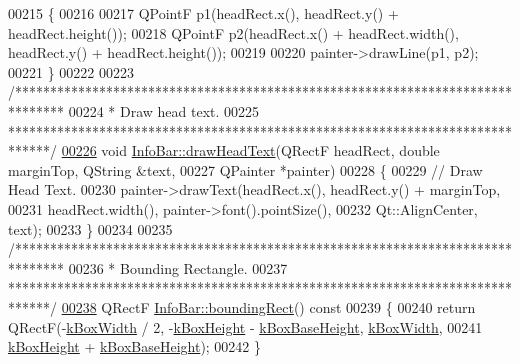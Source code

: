 \begin{DoxyCode}
00215 \{
00216 
00217   QPointF p1(headRect.x(), headRect.y() + headRect.height());
00218   QPointF p2(headRect.x() + headRect.width(), headRect.y() + headRect.height());
00219 
00220   painter->drawLine(p1, p2);
00221 \}
00222 
00223 \textcolor{comment}{/*******************************************************************************}
00224 \textcolor{comment}{ * Draw head text.}
00225 \textcolor{comment}{ ******************************************************************************/}
\hypertarget{infobar_8cpp_source_l00226}{}\hyperlink{class_info_bar_a912f4b2babec3df1aad3d31bc54a6e34}{00226} \textcolor{keywordtype}{void} \hyperlink{class_info_bar_a912f4b2babec3df1aad3d31bc54a6e34}{InfoBar::drawHeadText}(QRectF headRect, \textcolor{keywordtype}{double} marginTop, QString &text,
00227                            QPainter *painter)
00228 \{
00229   \textcolor{comment}{// Draw Head Text.}
00230   painter->drawText(headRect.x(), headRect.y() + marginTop,
00231                     headRect.width(), painter->font().pointSize(),
00232                     Qt::AlignCenter, text);
00233 \}
00234 
00235 \textcolor{comment}{/*******************************************************************************}
00236 \textcolor{comment}{ * Bounding Rectangle.}
00237 \textcolor{comment}{ ******************************************************************************/}
\hypertarget{infobar_8cpp_source_l00238}{}\hyperlink{class_info_bar_a564aacb3b64bdb5fbcaef8a432a0b49e}{00238} QRectF \hyperlink{class_info_bar_a564aacb3b64bdb5fbcaef8a432a0b49e}{InfoBar::boundingRect}()\textcolor{keyword}{ const}
00239 \textcolor{keyword}{}\{
00240   \textcolor{keywordflow}{return} QRectF(-\hyperlink{class_info_bar_a58f7773f4265d7e759f2eeb4c9aac48d}{kBoxWidth} / 2, -\hyperlink{class_info_bar_aedf2e766968ea9ba3e691f24efb8c117}{kBoxHeight} - \hyperlink{class_info_bar_a0f2f7b614000ae1d317ec3819acabbf2}{kBoxBaseHeight}, 
      \hyperlink{class_info_bar_a58f7773f4265d7e759f2eeb4c9aac48d}{kBoxWidth},
00241                 \hyperlink{class_info_bar_aedf2e766968ea9ba3e691f24efb8c117}{kBoxHeight} + \hyperlink{class_info_bar_a0f2f7b614000ae1d317ec3819acabbf2}{kBoxBaseHeight});
00242 \}
\end{DoxyCode}
